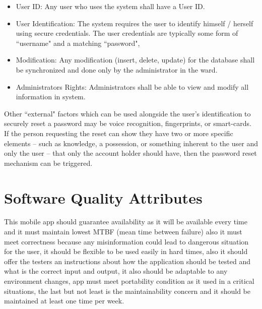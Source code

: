 \documentclass{scrreprt}
\begin{document}
\begin{itemize}

    \item User ID: Any user who uses the system shall have a User ID.
    \item User Identification: The system requires the user to identify himself / herself using secure credentials. The user credentials are typically some form of ``username" and a matching ``password", 

\item  Modification: Any modification (insert, delete, update) for the database shall be synchronized and done only by the administrator in the ward.
\item Administrators Rights: Administrators shall be able to view and modify all information in system.
\end{itemize}

Other ``external" factors which can be used alongside the user’s identification to securely reset a password may be voice recognition, fingerprints, or smart-cards. If the person requesting the reset can show they have two or more specific elements – such as knowledge, a possession, or something inherent to the user and only the user – that only the account holder should have, then the password reset mechanism can be triggered.

\section{Software Quality Attributes}
This mobile app should guarantee availability as it will be available every time and it must maintain lowest MTBF (mean time between failure) also it must meet correctness because any misinformation could lead to dangerous situation for the user, it should be flexible to be used easily in hard times, also it should offer the testers an instructions about how the application should be tested and what is the correct input and output, it also should be adaptable to any environment changes, app must meet portability condition as it used in a critical situations, the last but not least is the maintainability concern and it should be maintained at least one time per week.
\end{document}
